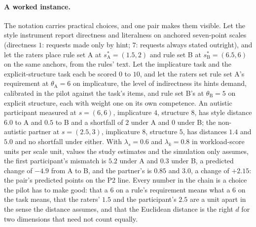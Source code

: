 \paragraph{A worked instance.} The notation carries practical choices, and one pair makes them visible. Let the style instrument report directness and literalness on anchored seven-point scales (directness $1$: requests made only by hint; $7$: requests always stated outright), and let the raters place rule set A at $s^{*}_{\mathrm{A}} = (1.5, 2)$ and rule set B at $s^{*}_{\mathrm{B}} = (6.5, 6)$ on the same anchors, from the rules' text. Let the implicature task and the explicit-structure task each be scored $0$ to $10$, and let the raters set rule set A's requirement at $\theta_{\mathrm{A}} = 6$ on implicature, the level of indirectness its hints demand, calibrated in the pilot against the task's items, and rule set B's at $\theta_{\mathrm{B}} = 5$ on explicit structure, each with weight one on its own competence. An autistic participant measured at $s = (6, 6)$, implicature $4$, structure $8$, has style distance $6.0$ to A and $0.5$ to B and a shortfall of $2$ under A and $0$ under B; the non-autistic partner at $s = (2.5, 3)$, implicature $8$, structure $5$, has distances $1.4$ and $5.0$ and no shortfall under either. With $\lambda_s = 0.6$ and $\lambda_k = 0.8$ in workload-score units per scale unit, values the study estimates and the simulation only assumes, the first participant's mismatch is $5.2$ under A and $0.3$ under B, a predicted change of $-4.9$ from A to B, and the partner's is $0.85$ and $3.0$, a change of $+2.15$: the pair's predicted points on the P2 line. Every number in the chain is a choice the pilot has to make good: that a $6$ on a rule's requirement means what a $6$ on the task means, that the raters' $1.5$ and the participant's $2.5$ are a unit apart in the sense the distance assumes, and that the Euclidean distance is the right $d$ for two dimensions that need not count equally.

